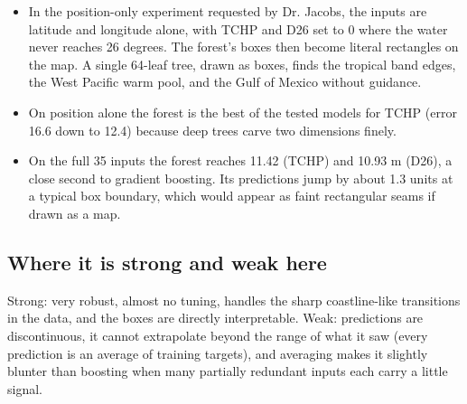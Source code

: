 \documentclass[11pt]{article}
\begin{document}
\begin{itemize}
\item In the position-only experiment requested by Dr. Jacobs, the inputs are latitude and longitude alone, with TCHP and D26 set to 0 where the water never reaches 26 degrees. The forest's boxes then become literal rectangles on the map. A single 64-leaf tree, drawn as boxes, finds the tropical band edges, the West Pacific warm pool, and the Gulf of Mexico without guidance.
\item On position alone the forest is the best of the tested models for TCHP (error 16.6 down to 12.4) because deep trees carve two dimensions finely.
\item On the full 35 inputs the forest reaches 11.42 (TCHP) and 10.93 m (D26), a close second to gradient boosting. Its predictions jump by about 1.3 units at a typical box boundary, which would appear as faint rectangular seams if drawn as a map.
\end{itemize}
\subsection*{Where it is strong and weak here}
Strong: very robust, almost no tuning, handles the sharp coastline-like transitions in the data, and the boxes are directly interpretable. Weak: predictions are discontinuous, it cannot extrapolate beyond the range of what it saw (every prediction is an average of training targets), and averaging makes it slightly blunter than boosting when many partially redundant inputs each carry a little signal.
\end{document}
